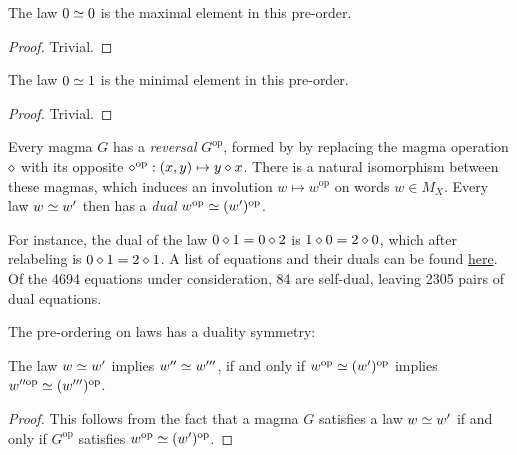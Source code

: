 \begin{lemma}\label{maximal}\leanok
  The law $0  \simeq  0$ is the maximal element in this pre-order.
\end{lemma}

\begin{proof}
  Trivial.
\end{proof}

\begin{lemma}\label{minimal}\leanok
  The law $0  \simeq  1$ is the minimal element in this pre-order.
\end{lemma}

\begin{proof}
  Trivial.
\end{proof}

Every magma $G$ has a \emph{reversal} $G^{\mathrm{op}}$, formed by by replacing the magma operation
$\diamond$ with its opposite $\diamond^{\mathrm{op}}:(x,y) \mapsto y \diamond x$. There is a natural isomorphism
between these magmas, which induces an involution $w \mapsto w^{\mathrm{op}}$ on words $w \in M_X$.
Every law $w  \simeq  w'$ then has a \emph{dual} $w^{\mathrm{op}}  \simeq  (w')^{\mathrm{op}}$.

For instance, the dual of the law $0 \diamond 1 = 0 \diamond 2$ is $1 \diamond 0 = 2 \diamond 0$, which after relabeling
is $0 \diamond 1 = 2 \diamond 1$. A list of equations and their duals can be found
\href{https://github.com/teorth/equational_theories/blob/main/data/dual_equations.md}{here}.
Of the 4694 equations under consideration, 84 are self-dual, leaving 2305 pairs of dual equations.

The pre-ordering on laws has a duality symmetry:

\begin{lemma}\leanok\label{duality}
  The law $w \simeq w'$ implies $w''\simeq w'''$, if and only if $w^{\mathrm{op}} \simeq (w')^{\mathrm{op}}$ implies $w''^{\mathrm{op}} \simeq (w''')^{\mathrm{op}}$.
\end{lemma}

\begin{proof}
  This follows from the fact that a magma $G$ satisfies a law $w  \simeq  w'$ if and only if $G^{\mathrm{op}}$ satisfies $w^{\mathrm{op}}  \simeq  (w')^{\mathrm{op}}$.
\end{proof}

